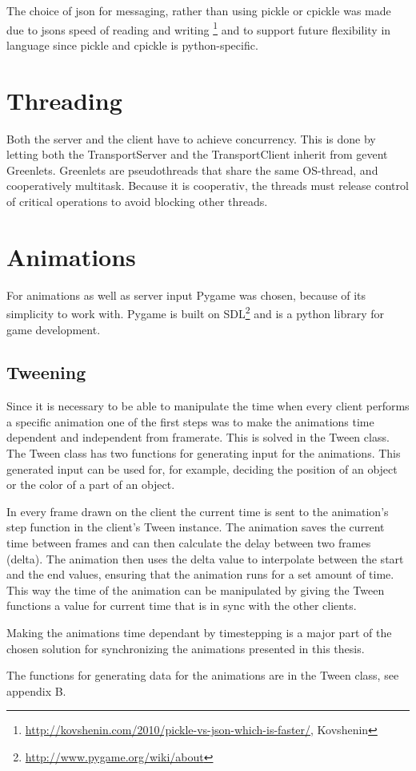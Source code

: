 The choice of json for messaging, rather than using pickle or cpickle was made due to jsons speed of reading and writing \footnote{\url{http://kovshenin.com/2010/pickle-vs-json-which-is-faster/}, Kovshenin} and to support future flexibility in language since pickle and cpickle is python-specific. 



\section{Threading}
\label{sec:threading}

Both the server and the client have to achieve concurrency. This is done by letting both the TransportServer and the TransportClient inherit from gevent Greenlets. 
Greenlets are pseudothreads that share the same OS-thread, and cooperatively multitask. Because it is cooperativ, the threads must release control of critical operations to avoid blocking other threads. 

\section{Animations}

For animations as well as server input Pygame was chosen, because of its simplicity to work with. Pygame is built on SDL\footnote{\url{http://www.pygame.org/wiki/about}} and is a python library for game development.

\subsection{Tweening}

Since it is necessary to be able to manipulate the time when every client performs a specific animation one of the first steps was to make the animations time dependent and independent from framerate. This is solved in the Tween class. The Tween class has two functions for generating input for the animations. This generated input can be used for, for example, deciding the position of an object or the color of a part of an object. 

In every frame drawn on the client the current time is sent to the animation's step function in the client's Tween instance. The animation saves the current time between frames and can then calculate the delay between two frames (delta). The animation then uses the delta value to interpolate between the start and the end values, ensuring that the animation runs for a set amount of time. This way the time of the animation can be manipulated by giving the Tween functions a value for current time that is in sync with the other clients. 

Making the animations time dependant by timestepping is a major part of the chosen solution for synchronizing the animations presented in this thesis. 

The functions for generating data for the animations are in the Tween class, see appendix B.  





